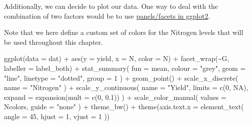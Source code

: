 \documentclass[
  letterpaper,
  DIV=11,
  numbers=noendperiod]{scrartcl}
\newenvironment{Shaded}{\begin{snugshade}}{\end{snugshade}}
\newcommand{\AttributeTok}[1]{\textcolor[rgb]{0.40,0.45,0.13}{#1}}
\newcommand{\ConstantTok}[1]{\textcolor[rgb]{0.56,0.35,0.01}{#1}}
\newcommand{\DecValTok}[1]{\textcolor[rgb]{0.68,0.00,0.00}{#1}}
\newcommand{\FloatTok}[1]{\textcolor[rgb]{0.68,0.00,0.00}{#1}}
\newcommand{\FunctionTok}[1]{\textcolor[rgb]{0.28,0.35,0.67}{#1}}
\newcommand{\NormalTok}[1]{\textcolor[rgb]{0.00,0.23,0.31}{#1}}
\newcommand{\OtherTok}[1]{\textcolor[rgb]{0.00,0.23,0.31}{#1}}
\newcommand{\SpecialCharTok}[1]{\textcolor[rgb]{0.37,0.37,0.37}{#1}}
\newcommand{\StringTok}[1]{\textcolor[rgb]{0.13,0.47,0.30}{#1}}
\begin{document}
Additionally, we can decide to plot our data. One way to deal with the
combination of two factors would be to use
\href{https://ggplot2.tidyverse.org/reference/facet_grid.html}{panels/facets
in ggplot2}.

Note that we here define a custom set of colors for the Nitrogen levels
that will be used throughout this chapter.

\begin{Shaded}
\end{Shaded}

\begin{Shaded}
\begin{Highlighting}[]
\FunctionTok{ggplot}\NormalTok{(}\AttributeTok{data =}\NormalTok{ dat) }\SpecialCharTok{+}
  \FunctionTok{aes}\NormalTok{(}\AttributeTok{y =}\NormalTok{ yield, }\AttributeTok{x =}\NormalTok{ N, }\AttributeTok{color =}\NormalTok{ N) }\SpecialCharTok{+}
  \FunctionTok{facet\_wrap}\NormalTok{(}\SpecialCharTok{\textasciitilde{}}\NormalTok{G, }\AttributeTok{labeller =}\NormalTok{ label\_both) }\SpecialCharTok{+}
  \FunctionTok{stat\_summary}\NormalTok{(}
    \AttributeTok{fun =}\NormalTok{ mean,}
    \AttributeTok{colour =} \StringTok{"grey"}\NormalTok{,}
    \AttributeTok{geom =} \StringTok{"line"}\NormalTok{,}
    \AttributeTok{linetype =} \StringTok{"dotted"}\NormalTok{,}
    \AttributeTok{group =} \DecValTok{1}
\NormalTok{  ) }\SpecialCharTok{+}
  \FunctionTok{geom\_point}\NormalTok{() }\SpecialCharTok{+}
  \FunctionTok{scale\_x\_discrete}\NormalTok{(}
    \AttributeTok{name =} \StringTok{"Nitrogen"}
\NormalTok{  ) }\SpecialCharTok{+}
  \FunctionTok{scale\_y\_continuous}\NormalTok{(}
    \AttributeTok{name =} \StringTok{"Yield"}\NormalTok{,}
    \AttributeTok{limits =} \FunctionTok{c}\NormalTok{(}\DecValTok{0}\NormalTok{, }\ConstantTok{NA}\NormalTok{),}
    \AttributeTok{expand =} \FunctionTok{expansion}\NormalTok{(}\AttributeTok{mult =} \FunctionTok{c}\NormalTok{(}\DecValTok{0}\NormalTok{, }\FloatTok{0.1}\NormalTok{))}
\NormalTok{  ) }\SpecialCharTok{+}
  \FunctionTok{scale\_color\_manual}\NormalTok{(}
    \AttributeTok{values =}\NormalTok{ Ncolors, }
    \AttributeTok{guide =} \StringTok{"none"}
\NormalTok{  ) }\SpecialCharTok{+}
  \FunctionTok{theme\_bw}\NormalTok{() }\SpecialCharTok{+}
  \FunctionTok{theme}\NormalTok{(}\AttributeTok{axis.text.x =} \FunctionTok{element\_text}\NormalTok{(}
    \AttributeTok{angle =} \DecValTok{45}\NormalTok{,}
    \AttributeTok{hjust =} \DecValTok{1}\NormalTok{,}
    \AttributeTok{vjust =} \DecValTok{1}
\NormalTok{  ))}
\end{Highlighting}
\end{Shaded}
\end{document}
